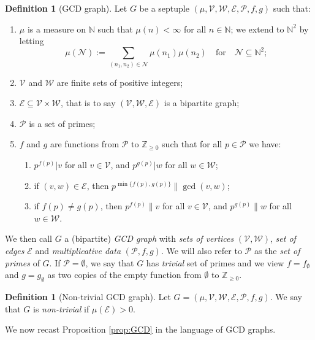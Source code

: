 \documentclass[12pt]{amsart}
\numberwithin{equation}{section}
\theoremstyle{definition}
\newtheorem{dfn}[lem]{Definition}
\theoremstyle{remark}
\newtheorem*{rem}{Remark}
\newcommand{\N}{\mathbb{N}}
\newcommand{\Z}{\mathbb{Z}}
\newcommand{\CE}{\mathcal{E}}
\newcommand{\CN}{\mathcal{N}}
\newcommand{\CP}{\mathcal{P}}
\newcommand{\CV}{\mathcal{V}}
\newcommand{\CW}{\mathcal{W}}
\renewcommand{\le}{\leqslant}
\renewcommand{\ge}{\geqslant}
\begin{document}
\begin{dfn}[GCD graph]\label{gcd graph dfn}
Let $G$ be a septuple $(\mu,\CV,\CW,\CE,\CP,f,g)$ such that:	
\begin{enumerate}
		\item $\mu$ is a measure on $\N$ such that $\mu(n)<\infty$ for all $n\in\N$; we extend to $\N^2$ by letting
	\[
	\mu(\CN):=\sum_{(n_1,n_2)\in\CN}\mu(n_1)\mu(n_2) 
	\quad\text{for}\quad\CN\subseteq\N^2;	
	\]	
		\item $\CV$ and $\CW$ are finite sets of positive integers;
		\item $\CE\subseteq\CV\times \CW$, that is to say $(\CV,\CW,\CE)$ is a bipartite graph;
		\item $\CP$ is a set of primes;
		\item $f$ and $g$ are functions from $\CP$ to $\Z_{\ge0}$ such that for all $p\in\CP$ we have:
		\begin{enumerate}
		\item $p^{f(p)}|v$ for all $v\in\CV$, and $p^{g(p)}|w$ for all $w\in\CW$;
		\item if $(v,w)\in\CE$, then $p^{\min\{f(p),g(p)\}}\|\gcd(v,w)$;
		\item if $f(p)\neq g(p)$, then $p^{f(p)}\|v$ for all $v\in\CV$, and $p^{g(p)}\|w$ for all $w\in\CW$.
		\end{enumerate}
\end{enumerate}
We then call $G$ a (bipartite) \emph{GCD graph} with \emph{sets of vertices} $(\CV,\CW)$, \emph{set of edges} $\CE$ and \emph{multiplicative data} $(\CP,f,g)$. We will also refer to $\CP$ as the \emph{set of primes} of $G$. If $\CP=\emptyset$, we say that $G$ has \emph{trivial} set of primes and we view $f=f_\emptyset$ and $g=g_\emptyset$ as two copies of the empty function from $\emptyset$ to $\mathbb{Z}_{\ge 0}$.
\end{dfn}

\begin{dfn}[Non-trivial GCD graph]\label{non-trivial gcd graph dfn}
Let $G=(\mu,\CV,\CW,\CE,\CP,f,g)$. We say that $G$ is {\it non-trivial} if $\mu(\CE)>0$. 
\end{dfn}


We now recast Proposition \ref{prop:GCD} in the language of GCD graphs. 
\end{document}
